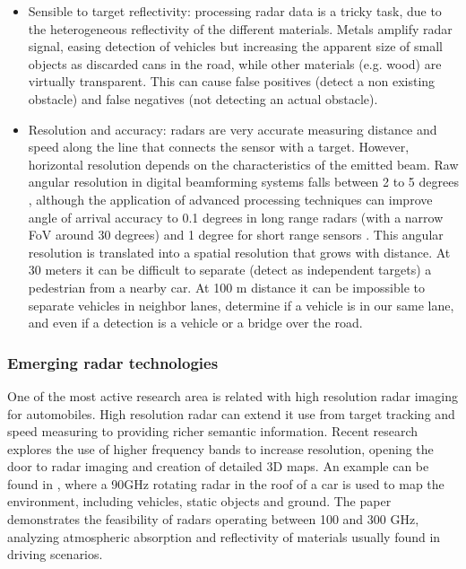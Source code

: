 \begin{itemize}
    \item Sensible to target reflectivity: processing radar data is a tricky
    task, due to the heterogeneous reflectivity of the different materials. 
    Metals amplify radar signal, easing detection of vehicles but increasing
    the apparent size of small objects as discarded cans in the road, while 
    other materials (e.g. wood) are virtually transparent.
    This can cause false positives (detect a non existing obstacle) and false
    negatives (not detecting an actual obstacle).
    
    \item Resolution and accuracy: radars are very accurate measuring distance
    and speed along the line that connects the sensor with a target. However, 
    horizontal resolution depends on the characteristics of the emitted beam.
    Raw angular resolution in digital beamforming systems falls between 2 to 5
    degrees \cite{Schneider2005}, although the application of advanced
    processing techniques can improve angle of arrival accuracy to 0.1 degrees 
    in long range radars (with a narrow FoV around 30 degrees) and 1
    degree for short range sensors \cite{Kissinger2012}. 
    This angular resolution is translated into a spatial resolution that grows
    with distance. At 30 meters it can be difficult to separate (detect as
    independent targets) a pedestrian from a nearby car. 
    At 100 m distance it can be impossible to separate vehicles in neighbor
    lanes, determine if a vehicle is in our same lane, and even if a detection
    is a vehicle or a bridge over the road.
\end{itemize}

\subsubsection{Emerging radar technologies}

One of the most active research area is related with high resolution radar
imaging for automobiles. High resolution radar can extend it use from target 
tracking and speed measuring to providing richer semantic information. 
Recent research explores the use of higher frequency bands to increase
resolution, opening the door to radar imaging and creation of detailed 3D maps. 
An example can be found in \cite{Reina2015}, where a 90GHz rotating radar in
the roof of a car is used to map the environment, including vehicles, static
objects and ground.
The paper \cite{Kohler2013} demonstrates the feasibility of radars operating
between 100 and 300 GHz, analyzing atmospheric absorption and reflectivity of
materials usually found in driving scenarios.

